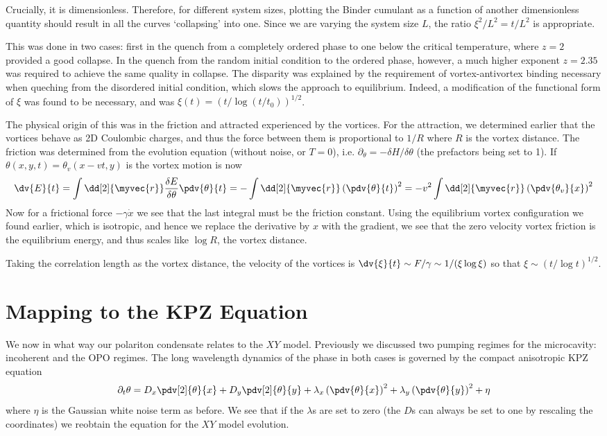 Crucially, it is dimensionless. Therefore, for different system sizes, plotting the Binder cumulant as a function of another dimensionless quantity should result in all the curves `collapsing' into one. Since we are varying the system size $L$, the ratio $\xi^2/L^2 = t/L^2$ is appropriate. 

This was done in two cases: first in the quench from a completely ordered phase to one below the critical temperature, where $z=2$ provided a good collapse. In the quench from the random initial condition to the ordered phase, however, a much higher exponent $z=2.35$ was required to achieve the same quality in collapse. The disparity was explained by the requirement of vortex-antivortex binding necessary when queching from the disordered initial condition, which slows the approach to equilibrium. Indeed, a modification of the functional form of $\xi$ was found to be necessary, and was $\xi(t) = (t/\log(t/t_0))^{1/2}$.

The physical origin of this was in the friction and attracted experienced by the vortices. For the attraction, we determined earlier that the vortices behave as 2D Coulombic charges, and thus the force between them is proportional to $1/R$ where $R$ is the vortex distance. The friction was determined from the evolution equation (without noise, or $T=0$), i.e. $\partial_ \theta = -\delta H/ \delta 
\theta$ (the prefactors being set to 1). If $\theta(x,y,t)= \theta_v(x-vt,y)$ is the vortex motion is now
\[
\dv{E}{t} = \int \dd[2]{\myvec{r}} \frac{\delta E}{\delta \theta}\pdv{\theta}{t} = - \int \dd[2]{\myvec{r}} \left(\pdv{\theta}{t}  \right)^2 = -v^2 \int \dd[2]{\myvec{r}} \left( \pdv{\theta_v}{x}\right)^2
\]
Now for a frictional force $-\gamma \dot{x}$ we see that the last integral must be the friction constant. Using the equilibrium vortex configuration we found earlier, which is isotropic, and hence we replace the derivative by $x$ with the gradient, we see that the zero velocity vortex friction is the equilibrium energy, and thus scales like $\log R$, the vortex distance. 

Taking the correlation length as the vortex distance, the velocity of the vortices is $\dv{\xi}{t} \sim F/\gamma \sim 1/(\xi \log \xi)$ so that $\xi \sim (t/\log t)^{1/2}$. 

\section{Mapping to the KPZ Equation}

We now in what way our polariton condensate relates to the $XY$ model. Previously we discussed two pumping regimes for the microcavity: incoherent and the OPO regimes. The long wavelength dynamics of the phase in both cases is governed by the compact anisotropic KPZ equation
\[
\partial_t \theta = D_x \pdv[2]{\theta}{x} + D_y \pdv[2]{\theta}{y} + \lambda_x \left(\pdv{\theta}{x}\right)^2  + \lambda_y\left( \pdv{\theta}{y}\right)^2 + \eta
\]
where $\eta$ is the Gaussian white noise term as before. We see that if the $\lambda$s are set to zero (the $D$s can always be set to one by rescaling the coordinates) we reobtain the equation for the $XY$ model evolution.

